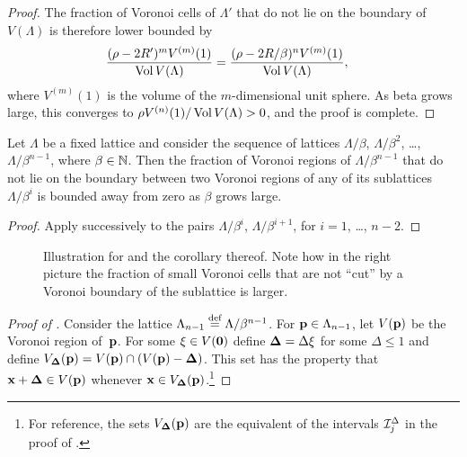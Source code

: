 \begin{subappendices}
\begin{proof}
    The fraction of Voronoi cells of $\Lambda'$ that do not lie on the boundary
    of $V(\Lambda)$ is therefore lower bounded by
    \begin{align*}
      \frac{(\rho - 2R')^m V^{(m)}(1)}{\operatorname{Vol} V(\Lambda)} &= \frac{(\rho -
      2R/\beta)^n V^{(m)}(1)}{\operatorname{Vol} V(\Lambda)},
    \end{align*}
    where $V^{(m)}(1)$ is the volume of the $m$-dimensional unit sphere. As beta
    grows large, this converges to $\rho V^{(n)}(1) / \operatorname{Vol} V(\Lambda) > 0$, and
    the proof is complete.
  \end{proof}

  \begin{corollary}
    Let $\Lambda$ be a fixed lattice and consider the sequence of lattices
    $\Lambda/\beta$, $\Lambda/\beta^2$, \dots, $\Lambda/\beta^{n-1}$, where
    $\beta \in {\mathbb{N}}$. Then the fraction of Voronoi regions of
    $\Lambda/\beta^{n-1}$ that do not lie on the boundary between two Voronoi
    regions of any of its sublattices $\Lambda/\beta^i$ is bounded
    away from zero as $\beta$ grows large.
  \end{corollary}

  \begin{proof}
    Apply  successively to the pairs $\Lambda/\beta^i$,
    $\Lambda/\beta^{i+1}$, for $i = 1$, \dots, $n-2$.
  \end{proof}

  \begin{figure}
    \centerline{
    \subfloat[$\beta = 3$]{}
    \hfil
    \subfloat[$\beta = 4$]{}
    }
    \caption{Illustration for  and the corollary thereof.
    Note how in the right picture the fraction of small Voronoi cells that are
    not ``cut'' by a Voronoi boundary of the sublattice is larger.}
    \label{fig:voronoiintersect}
  \end{figure}

  \begin{proof}[Proof of ]
    Consider the lattice ${\Lambda_{n-1}} \stackrel{\text{def}}{=} \Lambda/\beta^{n-1}$. For $\mathbf{p} \in
    {\Lambda_{n-1}}$, let $V(\mathbf{p})$ be the Voronoi region of~$\mathbf{p}$.
    For some $\mathbf{\xi} \in V(\mathbf{0})$ define $\mathbf{\Delta} = \Delta \mathbf{\xi}$ for some $\Delta \le
    1$ and define ${V_{\mathbf{\Delta}}}(\mathbf{p}) = V(\mathbf{p}) \cap (V(\mathbf{p}) - \mathbf{\Delta})$. This set has the
    property that $\mathbf{x} + \mathbf{\Delta} \in V(\mathbf{p})$ whenever $\mathbf{x} \in {V_{\mathbf{\Delta}}}(\mathbf{p})$.\footnote{For
    reference, the sets ${V_{\mathbf{\Delta}}}(\mathbf{p})$ are the equivalent of the intervals
    $\mathcal{I}_j^{\Delta}$ in the proof of .}


\end{proof}
\end{subappendices}
